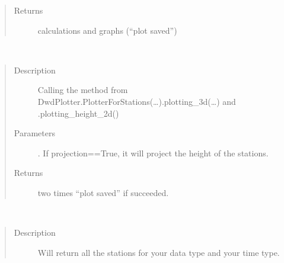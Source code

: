 \documentclass[letterpaper,10pt,english]{sphinxmanual}
\begin{document}
\begin{fulllineitems}
\begin{fulllineitems}
\begin{quote}
\begin{description}
\begin{itemize}
\end{itemize}

\item[{Returns}] \leavevmode
\sphinxAtStartPar
calculations and graphs (“plot saved”)

\end{description}\end{quote}

\end{fulllineitems}


\begin{fulllineitems}
\label{\detokenize{DwdMain:DwdMain.DwdMain.main_plotter_stations}}~\begin{quote}\begin{description}
\item[{Description}] \leavevmode
\sphinxAtStartPar
Calling the method from DwdPlotter.PlotterForStations(…).plotting\_3d(…) and .plotting\_height\_2d()

\item[{Parameters}] \leavevmode
\sphinxAtStartPar
{} \textendash{} . If projection==True, it will project the height of the stations.

\item[{Returns}] \leavevmode
\sphinxAtStartPar
two times “plot saved” if succeeded.

\end{description}\end{quote}

\end{fulllineitems}


\begin{fulllineitems}
\label{\detokenize{DwdMain:DwdMain.DwdMain.main_station_array}}~\begin{quote}\begin{description}
\item[{Description}] \leavevmode
\sphinxAtStartPar
Will return all the stations for your data type and your time type.


\end{description}
\end{quote}
\end{fulllineitems}
\end{fulllineitems}
\end{document}
